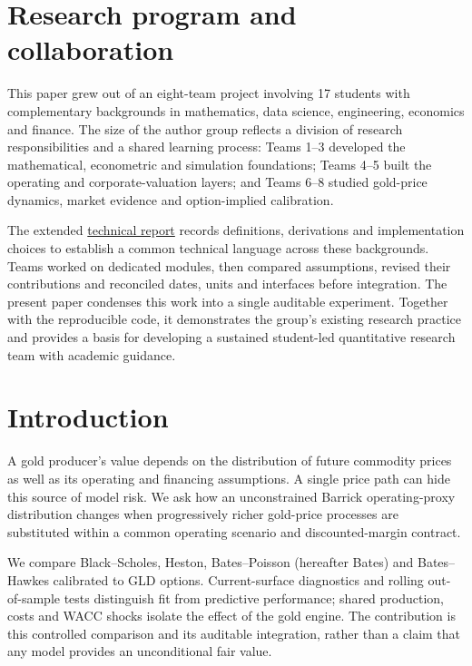 \section*{Research program and collaboration}
This paper grew out of an eight-team project involving 17 students with complementary backgrounds in mathematics, data science, engineering, economics and finance. The size of the author group reflects a division of research responsibilities and a shared learning process: Teams 1--3 developed the mathematical, econometric and simulation foundations; Teams 4--5 built the operating and corporate-valuation layers; and Teams 6--8 studied gold-price dynamics, market evidence and option-implied calibration.

The extended \href{https://github.com/SFClubPoliTo/Research/blob/main/Barrick-Gold/Complete-Valuation/outputs/report_unificato/Articolo.pdf}{technical report} records definitions, derivations and implementation choices to establish a common technical language across these backgrounds. Teams worked on dedicated modules, then compared assumptions, revised their contributions and reconciled dates, units and interfaces before integration. The present paper condenses this work into a single auditable experiment. Together with the reproducible code, it demonstrates the group's existing research practice and provides a basis for developing a sustained student-led quantitative research team with academic guidance.

\section{Introduction}
A gold producer's value depends on the distribution of future commodity prices as well as its operating and financing assumptions. A single price path can hide this source of model risk. We ask how an unconstrained Barrick operating-proxy distribution changes when progressively richer gold-price processes are substituted within a common operating scenario and discounted-margin contract.

We compare Black--Scholes, Heston, Bates--Poisson (hereafter Bates) and Bates--Hawkes calibrated to GLD options. Current-surface diagnostics and rolling out-of-sample tests distinguish fit from predictive performance; shared production, costs and WACC shocks isolate the effect of the gold engine. The contribution is this controlled comparison and its auditable integration, rather than a claim that any model provides an unconditional fair value.
